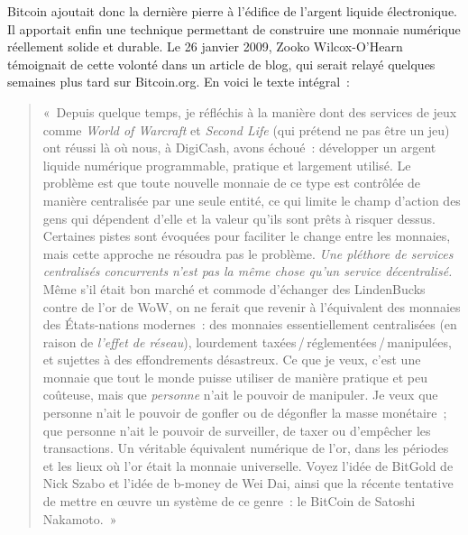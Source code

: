Bitcoin ajoutait donc la dernière pierre à l'édifice de l'argent liquide électronique. Il apportait enfin une technique permettant de construire une monnaie numérique réellement solide et durable. Le 26 janvier 2009, Zooko Wilcox-O'Hearn témoignait de cette volonté dans un article de blog, qui serait relayé quelques semaines plus tard sur Bitcoin.org. En voici le texte intégral~:

\begin{quote}
«~Depuis quelque temps, je réfléchis à la manière dont des services de jeux comme \emph{World of Warcraft} et \emph{Second Life} (qui prétend ne pas être un jeu) ont réussi là où nous, à DigiCash, avons échoué~: développer un argent liquide numérique programmable, pratique et largement utilisé. Le problème est que toute nouvelle monnaie de ce type est contrôlée de manière centralisée par une seule entité, ce qui limite le champ d'action des gens qui dépendent d'elle et la valeur qu'ils sont prêts à risquer dessus. Certaines pistes sont évoquées pour faciliter le change entre les monnaies, mais cette approche ne résoudra pas le problème. \emph{Une pléthore de services centralisés concurrents n'est pas la même chose qu'un service décentralisé.} Même s'il était bon marché et commode d'échanger des LindenBucks contre de l'or de WoW, on ne ferait que revenir à l'équivalent des monnaies des États-nations modernes~: des monnaies essentiellement centralisées (en raison de \emph{l'effet de réseau}), lourdement taxées\,/\,réglementées\,/\,manipulées, et sujettes à des effondrements désastreux. Ce que je veux, c'est une monnaie que tout le monde puisse utiliser de manière pratique et peu coûteuse, mais que \emph{personne} n'ait le pouvoir de manipuler. Je veux que personne n'ait le pouvoir de gonfler ou de dégonfler la masse monétaire~; que personne n'ait le pouvoir de surveiller, de taxer ou d'empêcher les transactions. Un véritable équivalent numérique de l'or, dans les périodes et les lieux où l'or était la monnaie universelle. Voyez l'idée de BitGold de Nick Szabo et l'idée de b-money de Wei Dai, ainsi que la récente tentative de mettre en œuvre un système de ce genre~: le BitCoin de Satoshi Nakamoto.~»

\end{quote}
